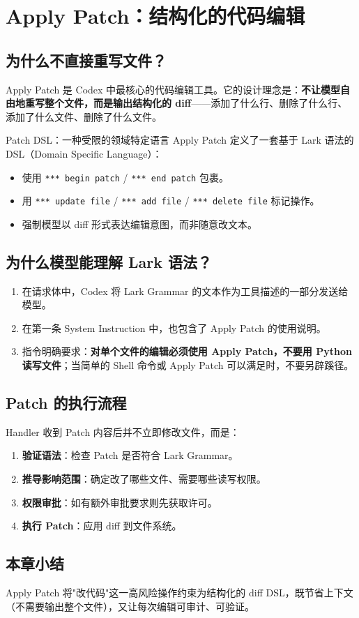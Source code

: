 \section{Apply Patch：结构化的代码编辑}

\subsection{为什么不直接重写文件？}

Apply Patch 是 Codex 中最核心的代码编辑工具。它的设计理念是：\textbf{不让模型自由地重写整个文件，而是输出结构化的 diff}——添加了什么行、删除了什么行、添加了什么文件、删除了什么文件。

\begin{importantbox}{Patch DSL：一种受限的领域特定语言}
Apply Patch 定义了一套基于 Lark 语法的 DSL（Domain Specific Language）：
\begin{itemize}
    \item 使用 \texttt{*** begin patch} / \texttt{*** end patch} 包裹。
    \item 用 \texttt{*** update file} / \texttt{*** add file} / \texttt{*** delete file} 标记操作。
    \item 强制模型以 diff 形式表达编辑意图，而非随意改文本。
\end{itemize}
\end{importantbox}

\subsection{为什么模型能理解 Lark 语法？}

\begin{enumerate}
    \item 在请求体中，Codex 将 Lark Grammar 的文本作为工具描述的一部分发送给模型。
    \item 在第一条 System Instruction 中，也包含了 Apply Patch 的使用说明。
    \item 指令明确要求：\textbf{对单个文件的编辑必须使用 Apply Patch，不要用 Python 读写文件}；当简单的 Shell 命令或 Apply Patch 可以满足时，不要另辟蹊径。
\end{enumerate}

\subsection{Patch 的执行流程}

Handler 收到 Patch 内容后并不立即修改文件，而是：
\begin{enumerate}
    \item \textbf{验证语法}：检查 Patch 是否符合 Lark Grammar。
    \item \textbf{推导影响范围}：确定改了哪些文件、需要哪些读写权限。
    \item \textbf{权限审批}：如有额外审批要求则先获取许可。
    \item \textbf{执行 Patch}：应用 diff 到文件系统。
\end{enumerate}

\subsection{本章小结}

Apply Patch 将"改代码"这一高风险操作约束为结构化的 diff DSL，既节省上下文（不需要输出整个文件），又让每次编辑可审计、可验证。


